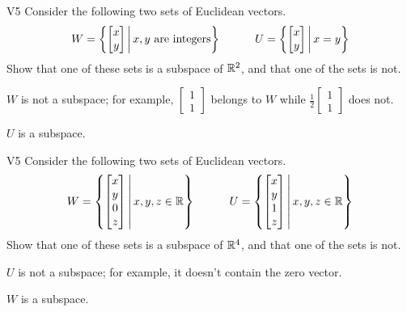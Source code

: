 \begin{problem}{V5}
Consider the following two sets of Euclidean vectors.
\[
  W = \left\{\begin{bmatrix} x \\ y \end{bmatrix}\,\middle|\,x,y \text{ are integers}\right\}
\hspace{3em}
  U = \left\{\begin{bmatrix} x \\ y \end{bmatrix}\,\middle|\,x=y\right\}
\]
Show that one of these sets is a subspace of \(\mathbb{R}^2\), and
that one of the sets is not.
\end{problem}
\begin{solution}
\(W\) is not a subspace; for example, \(\begin{bmatrix} 1 \\ 1 \end{bmatrix}\)
belongs to \(W\) while \(\frac{1}{2}\begin{bmatrix} 1 \\ 1 \end{bmatrix}\)
does not.

\(U\) is a subspace.
\end{solution}

\begin{problem}{V5}
Consider the following two sets of Euclidean vectors.
\[
  W = \left\{\begin{bmatrix} x \\ y \\ 0 \\ z \end{bmatrix}\,\middle|\,x,y,z\in\mathbb{R}\right\}
\hspace{3em}
  U = \left\{\begin{bmatrix} x \\ y \\ 1 \\ z \end{bmatrix}\,\middle|\,x,y,z\in\mathbb{R}\right\}
\]
Show that one of these sets is a subspace of \(\mathbb{R}^4\), and
that one of the sets is not.
\end{problem}
\begin{solution}
\(U\) is not a subspace; for example, it doesn't contain the zero vector.

\(W\) is a subspace.
\end{solution}




